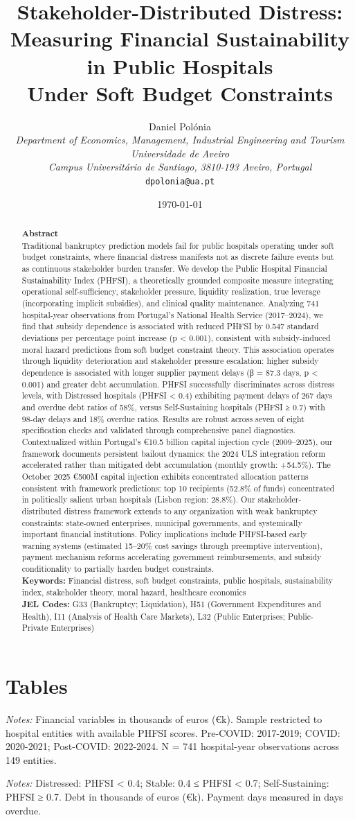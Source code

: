 \documentclass[12pt,oneside]{article}
\title{\textbf{Stakeholder-Distributed Distress: \\
    Measuring Financial Sustainability in Public Hospitals \\
    Under Soft Budget Constraints}}
\author{
    Daniel Polónia \\
    \textit{Department of Economics, Management, Industrial Engineering and Tourism} \\
    \textit{Universidade de Aveiro} \\
    \textit{Campus Universitário de Santiago, 3810-193 Aveiro, Portugal} \\
    \texttt{dpolonia@ua.pt} \\[2em]
}
\date{\today}
\newcommand{\theabstract}{
\textbf{Abstract} \\[1em]
Traditional bankruptcy prediction models fail for public hospitals operating under soft budget constraints, where financial distress manifests not as discrete failure events but as continuous stakeholder burden transfer. We develop the Public Hospital Financial Sustainability Index (PHFSI), a theoretically grounded composite measure integrating operational self-sufficiency, stakeholder pressure, liquidity realization, true leverage (incorporating implicit subsidies), and clinical quality maintenance. Analyzing 741 hospital-year observations from Portugal's National Health Service (2017--2024), we find that subsidy dependence is associated with reduced PHFSI by 0.547 standard deviations per percentage point increase (p < 0.001), consistent with subsidy-induced moral hazard predictions from soft budget constraint theory. This association operates through liquidity deterioration and stakeholder pressure escalation: higher subsidy dependence is associated with longer supplier payment delays (β = 87.3 days, p < 0.001) and greater debt accumulation. PHFSI successfully discriminates across distress levels, with Distressed hospitals (PHFSI < 0.4) exhibiting payment delays of 267 days and overdue debt ratios of 58\%, versus Self-Sustaining hospitals (PHFSI ≥ 0.7) with 98-day delays and 18\% overdue ratios. Results are robust across seven of eight specification checks and validated through comprehensive panel diagnostics. Contextualized within Portugal's €10.5 billion capital injection cycle (2009--2025), our framework documents persistent bailout dynamics: the 2024 ULS integration reform accelerated rather than mitigated debt accumulation (monthly growth: +54.5\%). The October 2025 €500M capital injection exhibits concentrated allocation patterns consistent with framework predictions: top 10 recipients (52.8\% of funds) concentrated in politically salient urban hospitals (Lisbon region: 28.8\%). Our stakeholder-distributed distress framework extends to any organization with weak bankruptcy constraints: state-owned enterprises, municipal governments, and systemically important financial institutions. Policy implications include PHFSI-based early warning systems (estimated 15--20\% cost savings through preemptive intervention), payment mechanism reforms accelerating government reimbursements, and subsidy conditionality to partially harden budget constraints. \\[1em]
\textbf{Keywords:} Financial distress, soft budget constraints, public hospitals, sustainability index, stakeholder theory, moral hazard, healthcare economics \\[1em]
\textbf{JEL Codes:} G33 (Bankruptcy; Liquidation), H51 (Government Expenditures and Health), I11 (Analysis of Health Care Markets), L32 (Public Enterprises; Public-Private Enterprises)
}
\begin{document}
\maketitle

\begin{abstract}
\theabstract
\end{abstract}

\newpage


\newpage

\newpage

\newpage

\newpage

\newpage


\newpage


\newpage
\section*{Tables}

\begin{table}[htbp]
\centering
\caption{Summary Statistics by Period}
\label{tab:summary_stats}
\footnotesize
\begin{threeparttable}

\begin{tablenotes}
\small
\item \textit{Notes:} Financial variables in thousands of euros (€k). Sample restricted to hospital entities with available PHFSI scores. Pre-COVID: 2017-2019; COVID: 2020-2021; Post-COVID: 2022-2024. N = 741 hospital-year observations across 149 entities.
\end{tablenotes}
\end{threeparttable}
\end{table}

\begin{table}[htbp]
\centering
\caption{PHFSI Distribution by Cluster}
\label{tab:phfsi_clusters}
\footnotesize
\begin{threeparttable}

\begin{tablenotes}
\small
\item \textit{Notes:} Distressed: PHFSI < 0.4; Stable: 0.4 ≤ PHFSI < 0.7; Self-Sustaining: PHFSI ≥ 0.7. Debt in thousands of euros (€k). Payment days measured in days overdue.
\end{tablenotes}
\end{threeparttable}
\end{table}
\end{document}
